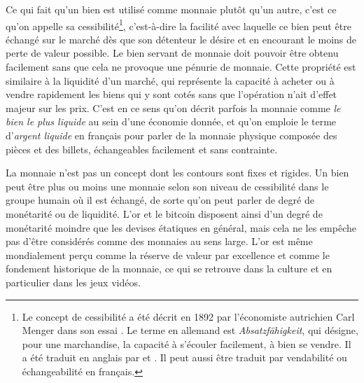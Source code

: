 Ce qui fait qu'un bien est utilisé comme monnaie plutôt qu'un autre, c'est ce qu'on appelle sa cessibilité\footnote{Le concept de cessibilité a été décrit en 1892 par l'économiste autrichien Carl Menger dans son essai . Le terme en allemand est \emph{Absatzfähigkeit}, qui désigne, pour une marchandise, la capacité à s'écouler facilement, à bien se vendre. Il a été traduit en anglais par  et . Il peut aussi être traduit par vendabilité ou échangeabilité en français.}, c'est-à-dire la facilité avec laquelle ce bien peut être échangé sur le marché dès que son détenteur le désire et en encourant le moins de perte de valeur possible. Le bien servant de monnaie doit pouvoir être obtenu facilement sans que cela ne provoque une pénurie de monnaie. Cette propriété est similaire à la liquidité d'un marché, qui représente la capacité à acheter ou à vendre rapidement les biens qui y sont cotés sans que l'opération n'ait d'effet majeur sur les prix. C'est en ce sens qu'on décrit parfois la monnaie comme \emph{le bien le plus liquide} au sein d'une économie donnée, et qu'on emploie le terme d'\emph{argent liquide} en français pour parler de la monnaie physique composée des pièces et des billets, échangeables facilement et sans contrainte.

La monnaie n'est pas un concept dont les contours sont fixes et rigides. Un bien peut être plus ou moins une monnaie selon son niveau de cessibilité dans le groupe humain où il est échangé, de sorte qu'on peut parler de degré de monétarité ou de liquidité. L'or et le bitcoin disposent ainsi d'un degré de monétarité moindre que les devises étatiques en général, mais cela ne les empêche pas d'être considérés comme des monnaies au sens large. L'or est même mondialement perçu comme la réserve de valeur par excellence et comme le fondement historique de la monnaie, ce qui se retrouve dans la culture et en particulier dans les jeux vidéos. %

